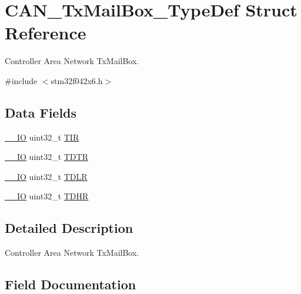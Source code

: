 \hypertarget{struct_c_a_n___tx_mail_box___type_def}{}\section{C\+A\+N\+\_\+\+Tx\+Mail\+Box\+\_\+\+Type\+Def Struct Reference}
\label{struct_c_a_n___tx_mail_box___type_def}


Controller Area Network Tx\+Mail\+Box.  




{\ttfamily \#include $<$stm32f042x6.\+h$>$}

\subsection*{Data Fields}
\begin{DoxyCompactItemize}
\item 
\hyperlink{core__sc300_8h_aec43007d9998a0a0e01faede4133d6be}{\+\_\+\+\_\+\+IO} uint32\+\_\+t \hyperlink{struct_c_a_n___tx_mail_box___type_def_a6921aa1c578a7d17c6e0eb33a73b6630}{T\+IR}
\item 
\hyperlink{core__sc300_8h_aec43007d9998a0a0e01faede4133d6be}{\+\_\+\+\_\+\+IO} uint32\+\_\+t \hyperlink{struct_c_a_n___tx_mail_box___type_def_aed87bed042dd9523ce086119a3bab0ea}{T\+D\+TR}
\item 
\hyperlink{core__sc300_8h_aec43007d9998a0a0e01faede4133d6be}{\+\_\+\+\_\+\+IO} uint32\+\_\+t \hyperlink{struct_c_a_n___tx_mail_box___type_def_aded1359e1a32512910bff534d57ade68}{T\+D\+LR}
\item 
\hyperlink{core__sc300_8h_aec43007d9998a0a0e01faede4133d6be}{\+\_\+\+\_\+\+IO} uint32\+\_\+t \hyperlink{struct_c_a_n___tx_mail_box___type_def_a90f7c1cf22683459c632d6040366eddf}{T\+D\+HR}
\end{DoxyCompactItemize}


\subsection{Detailed Description}
Controller Area Network Tx\+Mail\+Box. 

\subsection{Field Documentation}
\mbox{\label{struct_c_a_n___tx_mail_box___type_def_a90f7c1cf22683459c632d6040366eddf}} 
